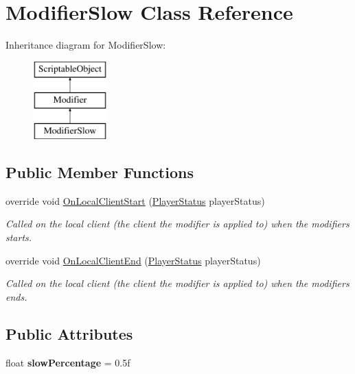 \hypertarget{class_modifier_slow}{}\section{Modifier\+Slow Class Reference}
\label{class_modifier_slow}
Inheritance diagram for Modifier\+Slow\+:\begin{figure}[H]
\begin{center}
\leavevmode
\includegraphics[height=3.000000cm]{class_modifier_slow}
\end{center}
\end{figure}
\subsection*{Public Member Functions}
\begin{DoxyCompactItemize}
\item 
override void \hyperlink{class_modifier_slow_a1eef9ea247bc45bf06b4c56c1a4803d0}{On\+Local\+Client\+Start} (\hyperlink{class_player_status}{Player\+Status} player\+Status)
\begin{DoxyCompactList}\small\item\em Called on the local client (the client the modifier is applied to) when the modifiers starts. \end{DoxyCompactList}\item 
override void \hyperlink{class_modifier_slow_a0682d3da4434ef281fbffccf34501eb3}{On\+Local\+Client\+End} (\hyperlink{class_player_status}{Player\+Status} player\+Status)
\begin{DoxyCompactList}\small\item\em Called on the local client (the client the modifier is applied to) when the modifiers ends. \end{DoxyCompactList}\end{DoxyCompactItemize}
\subsection*{Public Attributes}
\begin{DoxyCompactItemize}
\item 
\hypertarget{class_modifier_slow_ac9026034522437786a83521a6ad016c9}{}\label{class_modifier_slow_ac9026034522437786a83521a6ad016c9} 
float {\bfseries slow\+Percentage} = 0.\+5f
\end{DoxyCompactItemize}
